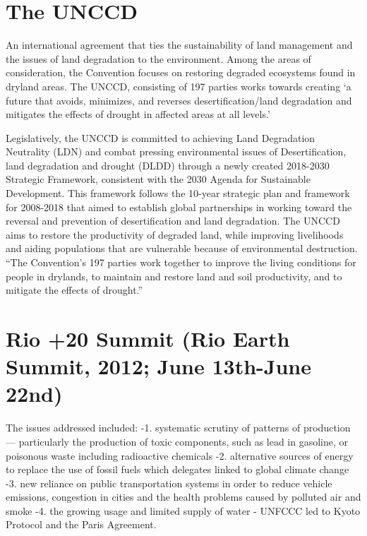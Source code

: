 \documentclass[
]{book}
\begin{document}
\hypertarget{the-unccd}{%
\section{The UNCCD}\label{the-unccd}}

An international agreement that ties the sustainability of land management and the issues of land degradation to the environment. Among the areas of consideration, the Convention focuses on restoring degraded ecosystems found in dryland areas. The UNCCD, consisting of 197 parties works towards creating `a future that avoids, minimizes, and reverses desertification/land degradation and mitigates the effects of drought in affected areas at all levels.'

Legislatively, the UNCCD is committed to achieving Land Degradation Neutrality (LDN) and combat pressing environmental issues of Desertification, land degradation and drought (DLDD) through a newly created 2018-2030 Strategic Framework, consistent with the 2030 Agenda for Sustainable Development. This framework follows the 10-year strategic plan and framework for 2008-2018 that aimed to establish global partnerships in working toward the reversal and prevention of desertification and land degradation. The UNCCD aims to restore the productivity of degraded land, while improving livelihoods and aiding populations that are vulnerable because of environmental destruction. ``The Convention's 197 parties work together to improve the living conditions for people in drylands, to maintain and restore land and soil productivity, and to mitigate the effects of drought.''

\hypertarget{rio-20-summit-rio-earth-summit-2012-june-13th-june-22nd}{%
\section{Rio +20 Summit (Rio Earth Summit, 2012; June 13th-June 22nd)}\label{rio-20-summit-rio-earth-summit-2012-june-13th-june-22nd}}

The issues addressed included:
-1. systematic scrutiny of patterns of production --- particularly the production of toxic components, such as lead in gasoline, or poisonous waste including radioactive chemicals
-2. alternative sources of energy to replace the use of fossil fuels which delegates linked to global climate change
-3. new reliance on public transportation systems in order to reduce vehicle emissions, congestion in cities and the health problems caused by polluted air and smoke
-4. the growing usage and limited supply of water
- UNFCCC led to Kyoto Protocol and the Paris Agreement.
\end{document}
